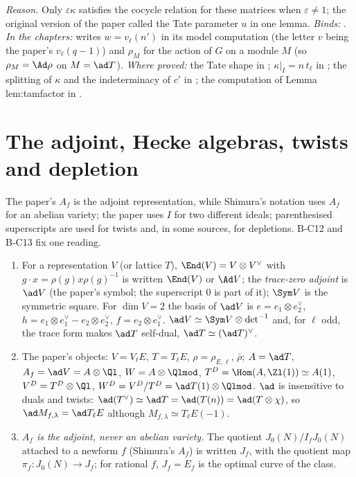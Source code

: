 \noindent\emph{Reason.} Only $\varepsilon\kappa$ satisfies the cocycle relation for these matrices when $\varepsilon\ne1$; the original
version of the paper called the Tate parameter $u$ in one lemma. \emph{Binds:}
. \emph{In the
chapters:}  writes $w=v_\ell(n')$ in its model computation (the letter $v$ being the paper's $v_\ell(q-1)$)
and $\rho_M$ for the action of $G$ on a module $M$ (so $\rho_M=\Ad\rho$ on $M=\ad T$). \emph{Where proved:} the Tate shape in
; $\kappa|_{I}=n\,t_\ell$ in ; the splitting of $\kappa$ and the indeterminacy of $c'$ in
; the computation of Lemma lem:tamfactor in .

\section{The adjoint, Hecke algebras, twists and depletion}\label{sec:notation:hecke}

The paper's $A_f$ is the adjoint representation, while Shimura's notation uses $A_f$ for an abelian variety; the paper uses $I$
for two different ideals; parenthesised superscripts are used for twists and, in some sources, for depletions. B-C12 and
B-C13 fix one reading.

\begin{convention}\label{conv:notation:bc12}
\leavevmode
\begin{enumerate}[label=(\alph*)]
\item For a representation $V$ (or lattice $T$), $\End(V)=V\otimes V^\vee$ with $g\cdot x=\rho(g)x\rho(g)^{-1}$ is written $\End(V)$ or
$\Ad V$; the \emph{trace-zero adjoint} is $\ad V$ (the paper's symbol; the superscript $0$ is part of it); $\Sym V$ is the symmetric
square. For $\dim V=2$ the basis of $\ad V$ is $e=e_1\otimes e_2^\vee$, $h=e_1\otimes e_1^\vee-e_2\otimes e_2^\vee$, $f=e_2\otimes e_1^\vee$.
$\ad V\simeq\Sym V\otimes\det^{-1}$ and, for $\ell$ odd, the trace form makes $\ad T$ self-dual, $\ad T\simeq(\ad T)^\vee$.
\item The paper's objects: $V=V_\ell E$, $T=T_\ell E$, $\rho=\rho_{E,\ell}$, $\bar\rho$; $A=\ad T$, $A_f=\ad V=A\otimes\Ql$, $W=A\otimes\Qlmod$,
$T^D=\Hom(A,\Zl(1))\simeq A(1)$, $V^D=T^D\otimes\Ql$, $W^D=V^D/T^D=\ad T(1)\otimes\Qlmod$. $\ad$ is insensitive to duals and twists:
$\ad(T^\vee)\simeq\ad T=\ad(T(n))=\ad(T\otimes\chi)$, so $\ad M_{f,\lambda}=\ad T_\ell E$ although $M_{f,\lambda}\simeq T_\ell E(-1)$.
\item \emph{$A_f$ is the adjoint, never an abelian variety.} The quotient $J_0(N)/I_fJ_0(N)$ attached to a newform $f$ (Shimura's
$A_f$) is written $J_f$, with the quotient map $\pi_f\colon J_0(N)\to J_f$; for rational $f$, $J_f=E_f$ is the optimal curve of the class.
\end{enumerate}
\end{convention}

